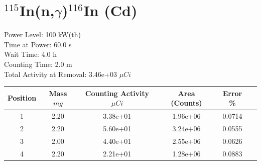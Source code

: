 \newpage

\section*{ $^{115}$In(n,$\gamma$)$^{116}$In (Cd) }

Power Level: 100 kW(th) \\
Time at Power: 60.0 s \\
Wait Time:  4.0 h \\
Counting Time:  2.0 m \\
Total Activity at Removal: 3.46e+03 $\mu Ci$

\begin{table}[h]
\centering
\begin{tabular}{ |c|c|c|c|c|c| }
 \hline
 Position & Mass $mg$ & Counting Activity $\mu Ci$ & Area (Counts) & Error \% \\
 \hline 
 1 & 2.20 & 3.38e+01 & 1.96e+06 & 0.0714 \\ 
\hline
 2 & 2.20 & 5.60e+01 & 3.24e+06 & 0.0555 \\ 
\hline
 3 & 2.00 & 4.40e+01 & 2.55e+06 & 0.0626 \\ 
\hline
 4 & 2.20 & 2.21e+01 & 1.28e+06 & 0.0883 \\ 
\hline
\end{tabular}
\end{table}

